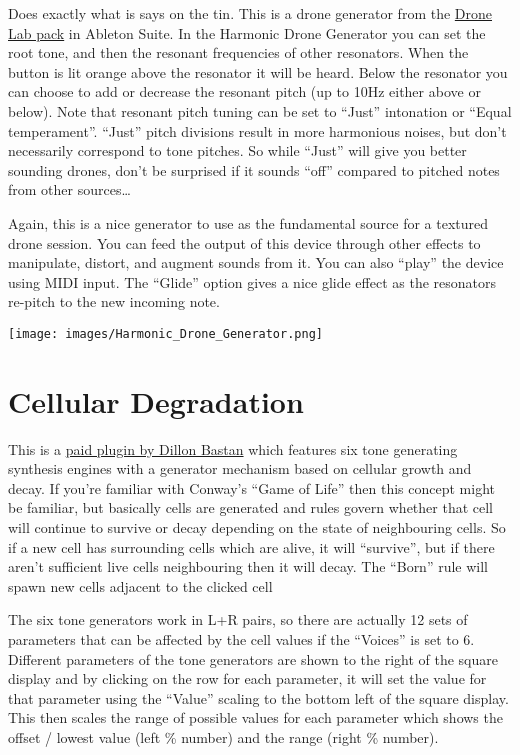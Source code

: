 \documentclass[
  12pt,
  letterpaper,
  oneside,
  open=any]{scrbook}
\begin{document}
Does exactly what is says on the tin. This is a drone generator from the
\href{https://www.ableton.com/en/packs/drone-lab/\#?}{Drone Lab pack} in
Ableton Suite. In the Harmonic Drone Generator you can set the root
tone, and then the resonant frequencies of other resonators. When the
button is lit orange above the resonator it will be heard. Below the
resonator you can choose to add or decrease the resonant pitch (up to
10Hz either above or below). Note that resonant pitch tuning can be set
to ``Just'' intonation or ``Equal temperament''. ``Just'' pitch
divisions result in more harmonious noises, but don't necessarily
correspond to tone pitches. So while ``Just'' will give you better
sounding drones, don't be surprised if it sounds ``off'' compared to
pitched notes from other sources\ldots{}

Again, this is a nice generator to use as the fundamental source for a
textured drone session. You can feed the output of this device through
other effects to manipulate, distort, and augment sounds from it. You
can also ``play'' the device using MIDI input. The ``Glide'' option
gives a nice glide effect as the resonators re-pitch to the new incoming
note.

\texttt{[image: images/Harmonic\_Drone\_Generator.png]}

\section{Cellular Degradation}\label{cellular-degradation}

This is a
\href{https://dillonbastan.gumroad.com/l/yyehc?layout=profile}{paid
plugin by Dillon Bastan} which features six tone generating synthesis
engines with a generator mechanism based on cellular growth and decay.
If you're familiar with Conway's ``Game of Life'' then this concept
might be familiar, but basically cells are generated and rules govern
whether that cell will continue to survive or decay depending on the
state of neighbouring cells. So if a new cell has surrounding cells
which are alive, it will ``survive'', but if there aren't sufficient
live cells neighbouring then it will decay. The ``Born'' rule will spawn
new cells adjacent to the clicked cell

The six tone generators work in L+R pairs, so there are actually 12 sets
of parameters that can be affected by the cell values if the ``Voices''
is set to 6. Different parameters of the tone generators are shown to
the right of the square display and by clicking on the row for each
parameter, it will set the value for that parameter using the ``Value''
scaling to the bottom left of the square display. This then scales the
range of possible values for each parameter which shows the offset /
lowest value (left \% number) and the range (right \% number).
\end{document}
